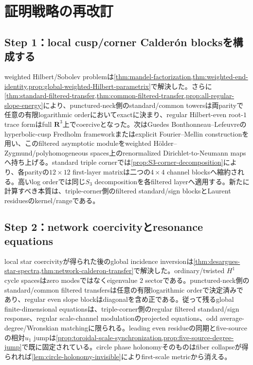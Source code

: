 \documentclass[11pt,a4paper]{ltjsarticle}
\theoremstyle{definition}
\theoremstyle{remark}
\newcommand{\RR}{\mathbf R}
\begin{document}
\section{証明戦略の再改訂}

\subsection{Step 1：local cusp/corner Calder\'on blocksを構成する}

weighted Hilbert/Sobolev problemは\cref{thm:mandel-factorization,thm:weighted-end-identity,prop:global-weighted-Hilbert-parametrix}で解決した。さらに\cref{thm:standard-filtered-transfer,thm:common-filtered-transfer,prop:all-regular-slope-energy}により、punctured-neck側のstandard/common towersは両parityで任意の有限logarithmic orderにおいてexactに決まり、regular Hilbert-even root-$1$ trace formはfull $\RR^3$上でcoerciveとなった。次はGuedes Bonthonneau--Lefeuvreのhyperbolic-cusp Fredholm framework\cite{GBL}またはexplicit Fourier--Mellin constructionを用い、このfiltered asymptotic moduleをweighted Hölder--Zygmund/polyhomogeneous spaces上のrenormalized Dirichlet-to-Neumann mapsへ持ち上げる。standard triple cornerでは\cref{prop:S3-corner-decomposition}により、各parityの$12\times12$ first-layer matrixは二つの$4\times4$ channel blocksへ縮約される。高いlog orderでは同じ$S_3$ decompositionを各filtered layerへ適用する。新たに計算すべき本質は、triple-corner側のfiltered standard/sign blocksとLaurent residuesのkernel/rangeである。

\subsection{Step 2：network coercivityとresonance equations}

local star coercivityが得られた後のglobal incidence inversionは\cref{thm:desargues-star-spectra,thm:network-calderon-transfer}で解決した。ordinary/twisted $H^1$ cycle spacesはzero modesではなくeigenvalue $2$ sectorである。punctured-neck側のstandard/common filtered transfersは任意の有限logarithmic orderで決定済みであり、regular even slope blockはdiagonalを含め正である。従って残るglobal finite-dimensional equationsは、triple-corner側のregular filtered standard/sign response、regular scale-channel modulationのprojected equations、odd average-degree/Wronskian matchingに限られる。leading even residueの同期とfive-sourceの相対$u_1$ jumpは\cref{prop:toroidal-scale-synchronization,prop:five-source-degree-jump}で既に固定されている。circle phase holonomyそのものはfiber collapseが得られれば\cref{lem:circle-holonomy-invisible}によりfirst-scale metricから消える。
\end{document}
